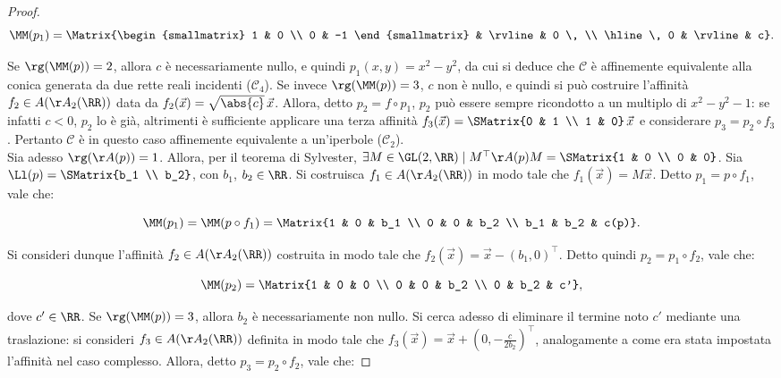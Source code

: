 \documentclass[11pt]{article}
\begin{document}
\begin{proof}
		\[ \MM(p_1) = \Matrix{\begin{smallmatrix}
				1 & 0 \\ 0 & -1
			\end{smallmatrix} & \rvline & 0 \, \\ \hline \, 0 & \rvline & c}. \]
		
		\vskip 0.05in
		
		Se $\rg(\MM(p)) = 2$, allora $c$ è necessariamente nullo, e quindi $p_1(x, y) = x^2 - y^2$, da cui
		si deduce che $\mathcal{C}$ è affinemente
		equivalente alla conica generata da due rette
		reali incidenti ($\mathcal{C}_4$). Se invece
		$\rg(\MM(p)) = 3$, $c$ non è nullo, e quindi
		si può costruire l'affinità $f_2 \in A(\AA_2(\RR))$
		data da $f_2(\vec x) = \sqrt{\abs{c}} \, \vec x$. Allora, detto $p_2 = f \circ p_1$, $p_2$ può essere
		sempre ricondotto a un
		multiplo di $x^2 - y^2 - 1$: se infatti $c < 0$,
		$p_2$ lo è già, altrimenti è sufficiente applicare
		una terza affinità $f_3(\vec x) = \SMatrix{0 & 1 \\ 1 & 0} \, \vec x$ e considerare $p_3 = p_2 \circ f_3$. Pertanto $\mathcal{C}$ è in questo caso
		affinemente equivalente a un'iperbole ($\mathcal{C}_2$). \\
		
		Sia adesso $\rg(\AA(p)) = 1$. Allora, per il teorema
		di Sylvester, $\exists M \in \GL(2, \RR) \mid M^\top \AA(p) M = \SMatrix{1 & 0 \\ 0 & 0}$. Sia $\Ll(p) = \SMatrix{b_1 \\ b_2}$, con $b_1$, $b_2 \in \RR$. Si costruisca $f_1 \in A(\AA_2(\RR))$ in modo tale
		che $f_1(\vec x) = M \vec x$. Detto
		$p_1 = p \circ f_1$, vale che:
		
		\[ \MM(p_1) = \MM(p \circ f_1) = \Matrix{1 & 0 & b_1 \\ 0 & 0 & b_2 \\ b_1 & b_2 & c(p)}. \]
		
		\vskip 0.1in
		
		Si consideri dunque l'affinità $f_2 \in A(\AA_2(\RR))$ costruita in modo tale che
		$f_2(\vec x) = \vec x - (b_1, 0)^\top$. Detto
		quindi $p_2 = p_1 \circ f_2$, vale che:
		
		\[ \MM(p_2) = \Matrix{1 & 0 & 0 \\ 0 & 0 & b_2 \\ 0 & b_2 & c'}, \]
		
		\vskip 0.07in
		
		dove $c' \in \RR$. Se $\rg(\MM(p)) = 3$, allora $b_2$ è necessariamente
		non nullo. Si cerca adesso di eliminare
		il termine noto $c'$ mediante una traslazione:
		si consideri $f_3 \in A(\AA_2(\RR))$ definita in modo tale che $f_3(\vec x) = \vec x + (0, -\frac{c}{2 b_2})^\top$, analogamente a come
		era stata impostata l'affinità nel caso complesso.
		Allora, detto $p_3 = p_2 \circ f_2$, vale che:
		

\end{proof}
\end{document}
